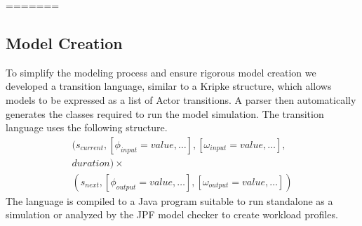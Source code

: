 =======
\subsection{Model Creation}
To simplify the modeling process and ensure rigorous model creation we
developed a transition language, similar to a Kripke structure, which allows
models to be expressed as a list of Actor transitions.  A parser then
automatically generates the classes required to run the model simulation.
The transition language uses the following structure.
\begin{equation}
\begin{split}
(s_{current}, [\phi_{input} = value,\ldots], [\omega_{input} = value,\ldots],\\
duration) \times \\
(s_{next}, [\phi_{output} =
value,\ldots], [\omega_{output} = value,\ldots])
\end{split}
\end{equation}
\noindent The language is compiled to a Java program suitable to run standalone
as a simulation or analyzed by the JPF model checker to create
workload profiles.
